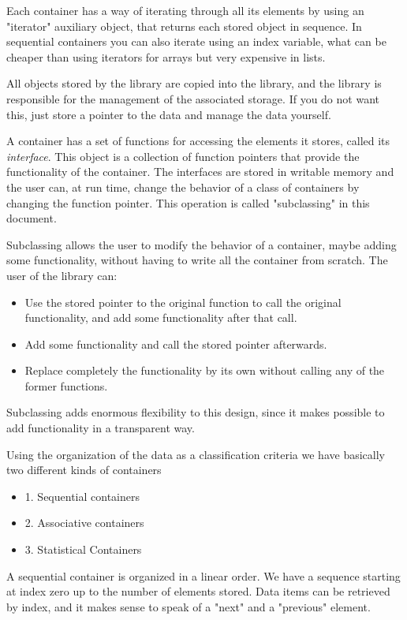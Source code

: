 \documentclass[12pt,a4paper,openany]{memoir} %
\begin{document}
Each container has a way of iterating through all its elements by using an "iterator" auxiliary object, that returns each stored object in sequence. In 
sequential containers you can also iterate using an index variable, what can be cheaper than using iterators for arrays but very expensive in lists.

All objects stored by the library are copied into the library, and the library is responsible for the management of the associated storage. If you do not want this, just store a pointer to the data and manage the data yourself.

A container has a set of functions for accessing the elements it stores, called its \textsl{interface}. This object is a collection of function
pointers that provide the functionality of the container.  The interfaces are stored in writable memory and the user can, at run time, change the
behavior of a class of containers by changing the function pointer. This operation is called "subclassing" in this document.

Subclassing allows the user to modify the behavior of a container, maybe adding some functionality, without having to write all the container from
scratch. The user of the library can:
\begin{itemize}
\item Use the stored pointer to the original function to call the original functionality, and add some functionality after that call.
\item Add some functionality and call the stored pointer afterwards.
\item Replace completely the functionality by its own without calling any of the former functions.
\end{itemize}
Subclassing adds enormous flexibility to this design, since it makes possible to add functionality in a transparent way.

Using the organization of the data as a classification criteria we have basically two different kinds of containers
\begin{itemize}
\item
1. Sequential containers
\item
2. Associative containers
\item
3. Statistical Containers
\end{itemize}

A sequential container is organized in a linear order. We have a sequence starting at index zero up to the number of elements stored. Data items can be 
retrieved by index, and it makes sense to speak of a "next" and a "previous" element.
\end{document}
